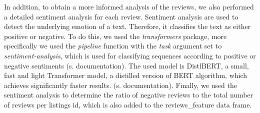 \documentclass[12pt, letterpaper]{article}
\begin{document}
In addition, to obtain a more informed analysis of the reviews, we also performed a detailed sentiment analysis for each review. Sentiment analysis are used to detect the underlying emotion of a text. Therefore, it classifies the text as either positive or negative. 
To do this, we used the \textit{transformers} package, more specifically we used the \textit{pipeline} function 
with the \textit{task} argument set to \textit{sentiment-analysis}, which is used for classifying sequences
according to positive or negative sentiments (s. documentation). The used model is DistlBERT, 
a small, fast and light Transformer model, a distilled version of BERT algorithm, which achieves significantly faster results. (s. documentation).
Finally, we used the sentiment analysis to determine the ratio of negative reviews to the total number of reviews per listings id, which is also added to the reviews\_feature data frame. 


\end{document}
